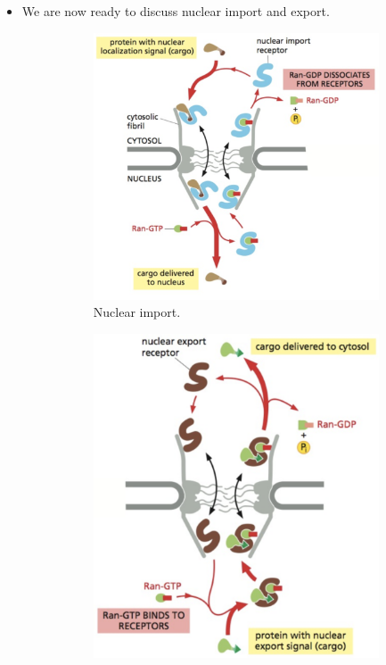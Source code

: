 \documentclass[../notes.tex]{subfiles}
\begin{document}
\begin{itemize}
\begin{itemize}
\begin{itemize}
        \end{itemize}
        \item We are now ready to discuss nuclear import and export.
        \begin{figure}[h!]
            \ContinuedFloat
            \centering
            \begin{subfigure}[b]{0.49\linewidth}
                \centering
                \includegraphics[width=0.82\linewidth]{../ExtFiles/nuclearImpExpb.png}
                \caption{Nuclear import.}
                \label{fig:nuclearImpExpb}
            \end{subfigure}
            \begin{subfigure}[b]{0.49\linewidth}
                \centering
                \includegraphics[width=0.7\linewidth]{../ExtFiles/nuclearImpExpc.png}

\end{subfigure}
\end{figure}
\end{itemize}
\end{itemize}
\end{document}
